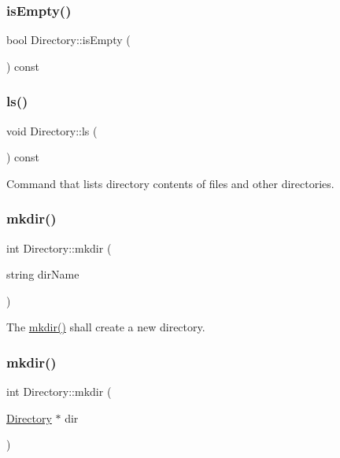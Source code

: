 \subsubsection{\texorpdfstring{is\+Empty()}{isEmpty()}}
{\footnotesize\ttfamily bool Directory\+::is\+Empty (\begin{DoxyParamCaption}{ }\end{DoxyParamCaption}) const}

\mbox{\label{class_directory_a97bf31f9a554ff687a410f735d8770dd}} 
\subsubsection{\texorpdfstring{ls()}{ls()}}
{\footnotesize\ttfamily void Directory\+::ls (\begin{DoxyParamCaption}{ }\end{DoxyParamCaption}) const}



Command that lists directory contents of files and other directories. 

\mbox{\label{class_directory_adfec0eb4ee88844c1483363b14543e92}} 
\subsubsection{\texorpdfstring{mkdir()}{mkdir()}\hspace{0.1cm}{\footnotesize\ttfamily [1/2]}}
{\footnotesize\ttfamily int Directory\+::mkdir (\begin{DoxyParamCaption}\item[{string}]{dir\+Name }\end{DoxyParamCaption})}



The \hyperlink{class_directory_adfec0eb4ee88844c1483363b14543e92}{mkdir()} shall create a new directory. 

\mbox{\label{class_directory_a02a77fbbfda041d430ec4d6f78ba8618}} 
\subsubsection{\texorpdfstring{mkdir()}{mkdir()}\hspace{0.1cm}{\footnotesize\ttfamily [2/2]}}
{\footnotesize\ttfamily int Directory\+::mkdir (\begin{DoxyParamCaption}\item[{\hyperlink{class_directory}{Directory} $\ast$}]{dir }\end{DoxyParamCaption})}

